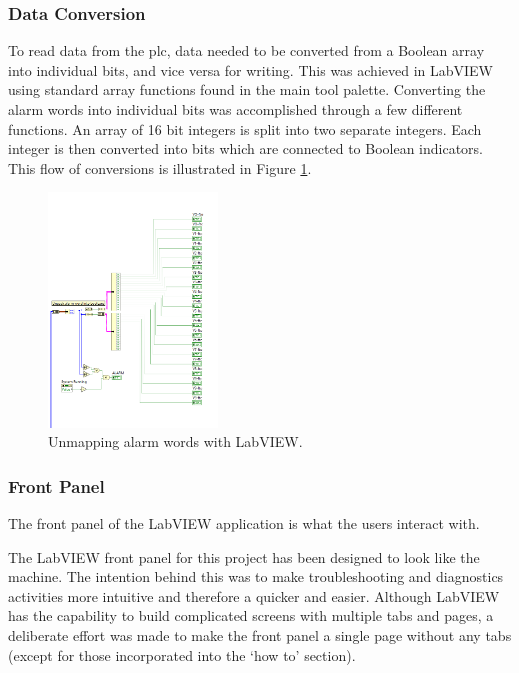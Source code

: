             
        \subsubsection{Data Conversion}
            To read data from the \acrshort{plc}, data needed to be converted from a Boolean array into individual bits, and vice versa for writing. This was achieved in LabVIEW using standard array functions found in the main tool palette. Converting the alarm words into individual bits was accomplished through a few different functions. An array of 16 bit integers is split into two separate integers. Each integer is then converted into bits which are connected to Boolean indicators. This flow of conversions is illustrated in Figure \ref{fig:labViewAlarmUnmap}.

        \begin{figure}[H]
                \centering
                \includegraphics[width = 0.4\textwidth]{2_images/labViewAlarmUnmap}
                \caption{Unmapping alarm words with LabVIEW.}
                \label{fig:labViewAlarmUnmap}
        \end{figure}   
            
        \subsubsection{Front Panel}

            The front panel of the LabVIEW application is what the users interact with.
            
            The LabVIEW front panel for this project has been designed to look like the machine. The intention behind this was to make troubleshooting and diagnostics activities more intuitive and therefore a quicker and easier. Although LabVIEW has the capability to build complicated screens with multiple tabs and pages, a deliberate effort was made to make the front panel a single page without any tabs (except for those incorporated into the `how to' section).
            
